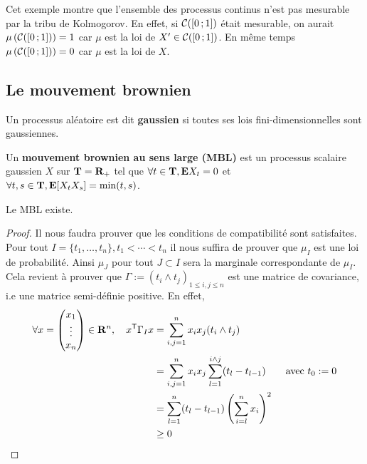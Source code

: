 	Cet exemple montre que l'ensemble des processus continus n'est pas mesurable par la tribu de Kolmogorov.
	En effet, si $\mathcal{C}(\mathopen{[}0\mathclose{}\mathpunct{};1\mathclose{]})$ était mesurable, on aurait $\mu \left( \mathcal{C}(\mathopen{[}0\mathclose{}\mathpunct{};1\mathclose{]}) \right) = 1$ car $\mu$ est la loi de $X' \in \mathcal{C}(\mathopen{[}0\mathclose{}\mathpunct{};1\mathclose{]})$.
	En même temps $\mu \left( \mathcal{C}(\mathopen{[}0\mathclose{}\mathpunct{};1\mathclose{]}) \right) = 0$ car $\mu$ est la loi de $X$.


\subsection{Le mouvement brownien}

	\begin{defn}
		Un processus aléatoire est dit \textbf{gaussien} si toutes ses lois fini-dimensionnelles sont gaussiennes.
	\end{defn}
	
	\begin{defn}
		Un \textbf{mouvement brownien au sens large (MBL)} est un processus scalaire gaussien $X$ sur $\mathbf{T} = \mathbf{R}_+$ tel que $\forall t \in \mathbf{T}, \mathbf{E} X_t = 0$ et $\forall t,s \in \mathbf{T}, \mathbf{E}[X_t X_s] = \min(t,s)$.
	\end{defn}
	
	\begin{pop}
		Le MBL existe.
	\end{pop}
	
	\begin{proof}
		Il nous faudra prouver que les conditions de compatibilité sont satisfaites.
		Pour tout $I = \{ t_1,\ldots,t_n \}, t_1 < \cdots < t_n$ il nous suffira de prouver que $\mu_I$ est une loi de probabilité.
		Ainsi $\mu_J$ pour tout $J \subset I$ sera la marginale correspondante de $\mu_I$.
		Cela revient à prouver que $\Gamma := (t_i \wedge t_j)_{1 \leq i,j \leq n}$ est une matrice de covariance, i.e une matrice semi-définie positive.
		En effet,
		\begin{align*}
		\forall x = \begin{pmatrix} x_1 \\ \vdots \\ x_n \end{pmatrix} \in \mathbf{R}^n,\quad
		x^\mathsf{T} \Gamma_I x & = \sum_{i,j = 1}^n x_i x_j (t_i \wedge t_j) \\
		                      & = \sum_{i,j = 1}^n x_i x_j \sum_{l = 1}^{i \wedge j} (t_l - t_{l - 1}) \qquad \text{avec}\ t_0 := 0 \\
		                      & = \sum_{l = 1}^n (t_l - t_{l - 1}) \left( \sum_{i = l}^n x_i \right)^2 \\
		                      & \geq 0
		\end{align*}
	\end{proof}
	
